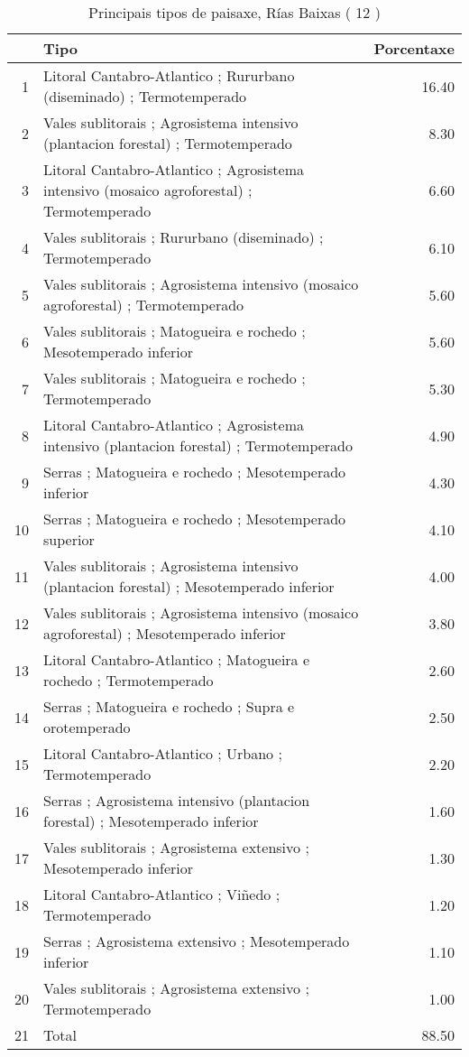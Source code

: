 \begin{table}[p]
\centering
\caption{Principais tipos de paisaxe,  Rías Baixas ( 12 )} 
\label{Tipos 12}
\begin{tabular}{rlr}
  \hline
 & Tipo & Porcentaxe \\ 
  \hline
1 & Litoral Cantabro-Atlantico ; Rururbano (diseminado) ; Termotemperado & 16.40 \\ 
  2 & Vales sublitorais ; Agrosistema intensivo (plantacion forestal) ; Termotemperado & 8.30 \\ 
  3 & Litoral Cantabro-Atlantico ; Agrosistema intensivo (mosaico agroforestal) ; Termotemperado & 6.60 \\ 
  4 & Vales sublitorais ; Rururbano (diseminado) ; Termotemperado & 6.10 \\ 
  5 & Vales sublitorais ; Agrosistema intensivo (mosaico agroforestal) ; Termotemperado & 5.60 \\ 
  6 & Vales sublitorais ; Matogueira e rochedo ; Mesotemperado inferior & 5.60 \\ 
  7 & Vales sublitorais ; Matogueira e rochedo ; Termotemperado & 5.30 \\ 
  8 & Litoral Cantabro-Atlantico ; Agrosistema intensivo (plantacion forestal) ; Termotemperado & 4.90 \\ 
  9 & Serras ; Matogueira e rochedo ; Mesotemperado inferior & 4.30 \\ 
  10 & Serras ; Matogueira e rochedo ; Mesotemperado superior & 4.10 \\ 
  11 & Vales sublitorais ; Agrosistema intensivo (plantacion forestal) ; Mesotemperado inferior & 4.00 \\ 
  12 & Vales sublitorais ; Agrosistema intensivo (mosaico agroforestal) ; Mesotemperado inferior & 3.80 \\ 
  13 & Litoral Cantabro-Atlantico ; Matogueira e rochedo ; Termotemperado & 2.60 \\ 
  14 & Serras ; Matogueira e rochedo ; Supra e orotemperado & 2.50 \\ 
  15 & Litoral Cantabro-Atlantico ; Urbano ; Termotemperado & 2.20 \\ 
  16 & Serras ; Agrosistema intensivo (plantacion forestal) ; Mesotemperado inferior & 1.60 \\ 
  17 & Vales sublitorais ; Agrosistema extensivo ; Mesotemperado inferior & 1.30 \\ 
  18 & Litoral Cantabro-Atlantico ; Viñedo ; Termotemperado & 1.20 \\ 
  19 & Serras ; Agrosistema extensivo ; Mesotemperado inferior & 1.10 \\ 
  20 & Vales sublitorais ; Agrosistema extensivo ; Termotemperado & 1.00 \\ 
  21 & Total & 88.50 \\ 
   \hline
\end{tabular}
\end{table}

